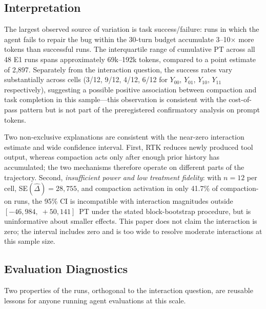 \documentclass{article}
\begin{document}
\subsection{Interpretation}

The largest observed source of variation is task success/failure: runs in which the agent fails to repair the bug within the 30-turn budget accumulate 3--10$\times$ more tokens than successful runs. The interquartile range of cumulative PT across all 48 E1 runs spans approximately 69k--192k tokens, compared to a point estimate of 2,897. Separately from the interaction question, the success rates vary substantially across cells (3/12, 9/12, 4/12, 6/12 for $Y_{00}$, $Y_{01}$, $Y_{10}$, $Y_{11}$ respectively), suggesting a possible positive association between compaction and task completion in this sample---this observation is consistent with the cost-of-pass pattern but is not part of the preregistered confirmatory analysis on prompt tokens.

Two non-exclusive explanations are consistent with the near-zero interaction estimate and wide confidence interval. First, RTK reduces newly produced tool output, whereas compaction acts only after enough prior history has accumulated; the two mechanisms therefore operate on different parts of the trajectory. Second, \emph{insufficient power and low treatment fidelity}: with $n=12$ per cell, SE$(\hat{\Delta})=28{,}755$, and compaction activation in only 41.7\% of compaction-on runs, the 95\% CI is incompatible with interaction magnitudes outside $[-46{,}984,\;+50{,}141]$~PT under the stated block-bootstrap procedure, but is uninformative about smaller effects. This paper does not claim the interaction is zero; the interval includes zero and is too wide to resolve moderate interactions at this sample size.

\subsection{Evaluation Diagnostics}
\label{sec:diagnostics}

Two properties of the runs, orthogonal to the interaction question, are reusable lessons for anyone running agent evaluations at this scale.
\end{document}
